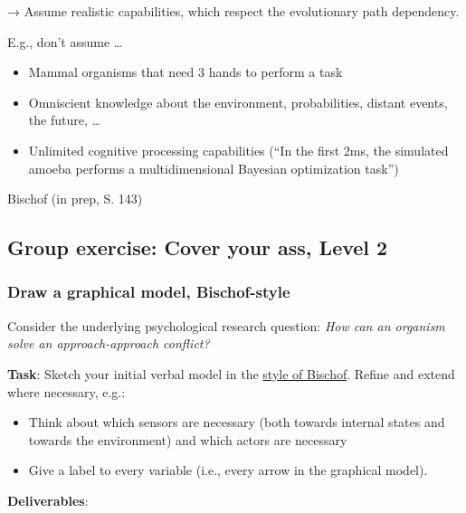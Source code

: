 \documentclass[
  letterpaper,
  DIV=11,
  numbers=noendperiod]{scrartcl}
\providecommand{\tightlist}{%
  \setlength{\itemsep}{0pt}\setlength{\parskip}{0pt}}\usepackage{longtable,booktabs,array}
\begin{document}
{→ Assume realistic capabilities, which respect the evolutionary path
dependency.}

E.g., don't assume \ldots{}

\begin{itemize}
\tightlist
\item
  Mammal organisms that need 3 hands to perform a task
\item
  Omniscient knowledge about the environment, probabilities, distant
  events, the future, \ldots{}
\item
  Unlimited cognitive processing capabilities (``In the first 2ms, the
  simulated amoeba performs a multidimensional Bayesian optimization
  task'')
\end{itemize}

Bischof (in prep, S. 143)

\hypertarget{fa-people-group-size1x-group-exercise-cover-your-ass-level-2}{%
\subsection{\texorpdfstring{{ Group exercise: Cover
your ass, Level
2}}{ Group exercise: Cover your ass, Level 2}}\label{fa-people-group-size1x-group-exercise-cover-your-ass-level-2}}

\hypertarget{draw-a-graphical-model-bischof-style}{%
\subsubsection{Draw a graphical model,
Bischof-style}\label{draw-a-graphical-model-bischof-style}}

Consider the underlying psychological research question: \emph{How can
an organism solve an approach-approach conflict?}

\textbf{Task}: Sketch your initial verbal model in the
\href{../../skills/Bischof-Notation/Bischof-Notation.qmd}{style of
Bischof}. Refine and extend where necessary, e.g.:

\begin{itemize}
\tightlist
\item
  Think about which sensors are necessary (both towards internal states
  and towards the environment) and which actors are necessary
\item
  Give a label to every variable (i.e., every arrow in the graphical
  model).
\end{itemize}

\textbf{Deliverables}:
\end{document}
